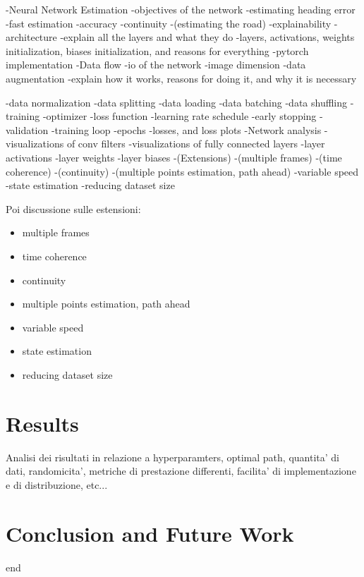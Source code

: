 \documentclass[a4paper,12pt,sort&compress]{article}
\begin{document}
-Neural Network Estimation
    -objectives of the network
        -estimating heading error
        -fast estimation
        -accuracy
        -continuity
        -(estimating the road)
        -explainability
    -architecture
        -explain all the layers and what they do
            -layers, activations, weights initialization, biases initialization, and reasons for everything
    -pytorch implementation
    -Data flow
        -io of the network
            -image dimension
        -data augmentation
            -explain how it works, reasons for doing it, and why it is necessary 

        -data normalization
        -data splitting
        -data loading
        -data batching
        -data shuffling
    -training
        -optimizer
        -loss function
        -learning rate schedule
        -early stopping
        -validation
        -training loop
        -epochs
        -losses, and loss plots
    -Network analysis
        -visualizations of conv filters
        -visualizations of fully connected layers
        -layer activations
        -layer weights
        -layer biases
    -(Extensions)
        -(multiple frames)
        -(time coherence)
        -(continuity)
        -(multiple points estimation, path ahead)
        -variable speed
        -state estimation
        -reducing dataset size

Poi discussione sulle estensioni:
\begin{itemize}
    \item multiple frames
    \item time coherence
    \item continuity
    \item multiple points estimation, path ahead
    \item variable speed
    \item state estimation
    \item reducing dataset size
\end{itemize}

\section{Results}
Analisi dei risultati in relazione a hyperparamters, optimal path, quantita' di
dati, randomicita', metriche di prestazione differenti, facilita' di
implementazione e di distribuzione, etc...


\newpage
\section{Conclusion and Future Work}
end
\end{document}
